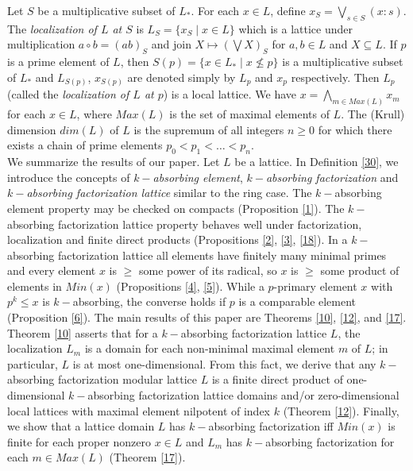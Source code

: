 \documentclass{amsart}
\theoremstyle{plain}
\theoremstyle{definition}
\theoremstyle{remark}
\begin{document}
Let $S$ be a multiplicative subset of $L_\ast$. For each $x\in L$, define $x_S=\bigvee_{s\in S}(x:s)$. The  {\em localization of $L$ at $S$} is $L_S=\{x_S\mid x\in L\}$ which is a lattice under multiplication $a\circ b= (ab)_S$ and join $X\mapsto  (\bigvee X)_S$ for $a,b\in L$ and $X\subseteq L$. 
If $p$ is a prime element of $L$, then $S(p)=\{x\in L_\ast\mid x\not\leq p\} $ is a multiplicative   subset of $L_\ast$ and 
$L_{S(p)}$, $x_{S(p)}$ are denoted simply by $L_p$ and $x_p$ respectively. Then $L_p$  (called the {\em localization of $L$ at $p$}) is a local lattice.
We have $x=\bigwedge_{m\in Max(L)} x_m$ for each $x\in L$, where $Max(L)$ is the set of maximal elements of $L$.
 The (Krull) dimension $dim(L)$ of $L$ is the supremum of all   integers $n\geq 0$ for which there exists a chain of prime elements $p_0<p_1<\ldots <p_n$.
\\[3mm]

We summarize the results of our paper.
Let $L$ be a lattice. In Definition \ref{30}, we introduce the concepts of {\em $k-$absorbing element}, {\em $k-$absorbing factorization} and {\em $k-$absorbing factorization lattice} similar to the ring case. 
The $k-$absorbing element property may be checked on compacts (Proposition \ref{1}). The $k-$absorbing factorization lattice   property behaves well under factorization, localization and finite direct products (Propositions  \ref{2},  \ref{3},  \ref{18}).
In a   $k-$absorbing factorization lattice all elements have finitely many minimal primes and every element $x$ is $\geq $  some power of its radical, so $x$ is $\geq$ some product of elements in $Min(x)$
(Propositions  \ref{4},  \ref{5}).
While a $p$-primary element $x$ with $p^k \leq x$ is $k-$absorbing, the converse holds if $p$ is a comparable element (Proposition \ref{6}).
The main results of this paper are Theorems \ref{10}, \ref{12}, and \ref{17}.
Theorem \ref{10} asserts that 
for a $k-$absorbing factorization lattice $L$, the localization $L_m$ is a domain for each non-minimal maximal element $m$ of $L$; in particular, $L$ is at most one-dimensional.
From this fact, we derive that any $k-$absorbing factorization modular lattice $L$  is a finite direct product of one-dimensional $k-$absorbing factorization lattice domains  and/or  zero-dimensional  local lattices  with  maximal element  nilpotent of index $k$ (Theorem \ref{12}).
Finally, we show that a lattice domain $L$ has $k-$absorbing factorization iff  $Min(x)$ is finite for each proper nonzero $x\in L$ and 
$L_m$  has $k-$absorbing factorization for each  $m\in Max(L)$
(Theorem \ref{17}).
\end{document}
